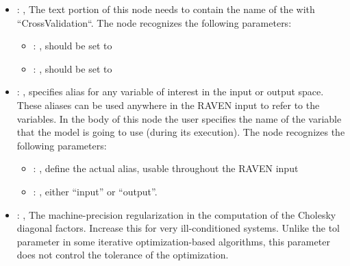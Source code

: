 \begin{itemize}
\begin{itemize}
        \item {}: ,
          List of IDs of features/variables to include in the transformation process.

        \item {}: ,
          Which space to search? Target or Feature?
      \end{itemize}

    \item {}: ,
      The text portion of this node needs to contain the name of the  with
               ``CrossValidation``.
      The  node recognizes the following parameters:
        \begin{itemize}
          \item {}: ,
            should be set to 
          \item {}: ,
            should be set to 
      \end{itemize}

    \item {}: ,
      specifies alias for         any variable of interest in the input or output space. These
      aliases can be used anywhere in the RAVEN input to         refer to the variables. In the body
      of this node the user specifies the name of the variable that the model is going to use
      (during its execution).
      The  node recognizes the following parameters:
        \begin{itemize}
          \item {}: ,
            define the actual alias, usable throughout the RAVEN input
          \item {}: ,
            either ``input'' or ``output''.
      \end{itemize}

    \item {}: ,
      The machine-precision regularization in the computation of the Cholesky
      diagonal factors. Increase this for very ill-conditioned systems. Unlike the tol
      parameter in some iterative optimization-based algorithms, this parameter does not
      control the tolerance of the optimization.


\end{itemize}
